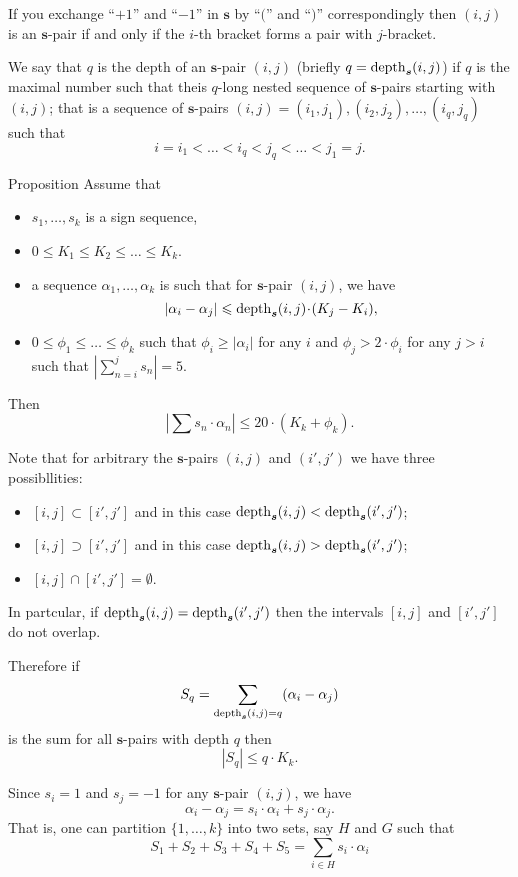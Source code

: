 \documentclass[a4paper,10pt]{amsart}
\begin{document}
If you exchange ``$+1$'' and ``$-1$'' in $\bm{s}$ by ``$($'' and ``$)$'' correspondingly then $(i,j)$ is an $\bm{s}$-pair
if and only if the $i$-th bracket forms a pair with $j$-bracket.

\medskip

We say that $q$ is the depth of an $\bm{s}$-pair $(i,j)$
(briefly $q=\mathop{\rm depth}\nolimits_{\bm{s}}(i,j)$) 
if $q$ is the maximal number such that theis $q$-long nested sequence of $\bm{s}$-pairs starting with $(i,j)$; 
that is a sequence of $\bm{s}$-pairs
$(i,j)=(i_1,j_1),(i_2,j_2),\dots,(i_q,j_q)$ such that
\[i=i_1<\dots<i_q<j_q<\dots<j_1=j.\]

\begin{thm}{Proposition}
Assume that
\begin{itemize}
\item $s_1,\dots, s_k$ is a sign sequence,
\item $0\le K_1\le K_2\le \dots\le K_k$.
\item a sequence $\alpha_1,\dots,\alpha_k$ is such that for $\bm{s}$-pair $(i,j)$, we have
\[|\alpha_i-\alpha_j|\le \depth_{\bm{s}}(i,j)\cdot(K_j-K_i),\]
\item $0\le \phi_1\le\dots\le\phi_k$ such that $\phi_i\ge |\alpha_i|$ for any $i$ and $\phi_j>2\cdot\phi_i$ for any $j>i$ such that $|\sum_{n=i}^js_n|=5$.
\end{itemize}
Then
\[|\sum s_n\cdot \alpha_n|\le 20\cdot( K_k+ \phi_k).\]

\end{thm}

Note that for arbitrary the $\bm{s}$-pairs $(i,j)$ and $(i',j')$
we have three possibllities:
\begin{itemize}
\item $[i,j]\subset [i',j']$ and in this case $\mathop{\rm depth}\nolimits_{\bm{s}}(i,j)<\mathop{\rm depth}\nolimits_{\bm{s}}(i',j')$;
\item $[i,j]\supset [i',j']$ and in this case $\mathop{\rm depth}\nolimits_{\bm{s}}(i,j)>\mathop{\rm depth}\nolimits_{\bm{s}}(i',j')$;
\item $[i,j]\cap [i',j']=\emptyset$.
\end{itemize}
In partcular, if $\mathop{\rm depth}\nolimits_{\bm{s}}(i,j)=\mathop{\rm depth}\nolimits_{\bm{s}}(i',j')$ then the intervals $[i,j]$ and $[i',j']$ do not overlap.


Therefore if 
\[S_q=\sum_{\mathop{\rm depth}\nolimits_{\bm{s}}(i,j)=q} (\alpha_i-\alpha_j)\] 
is the sum for all $\bm{s}$-pairs with depth $q$ then 
\[|S_q|\le q\cdot K_k.\]

Since $s_i=1$ and $s_j=-1$ for any $\bm{s}$-pair $(i,j)$,
we have
\[\alpha_i-\alpha_j=s_i\cdot\alpha_i+s_j\cdot\alpha_j.\]
That is, one can partition $\{1,\dots,k\}$ into two sets, say $H$ and $G$ such that
\[S_1+S_2+S_3+S_4+S_5=\sum_{i\in H}s_i\cdot \alpha_i\] 
\end{document}

